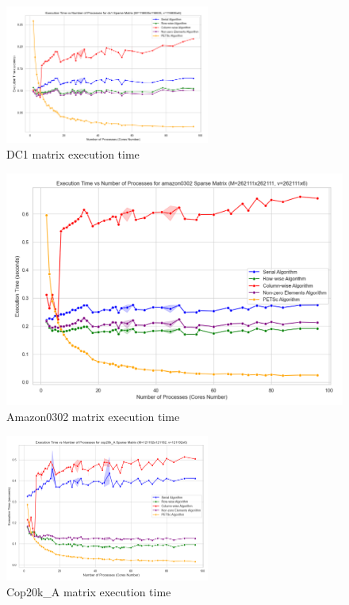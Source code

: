 \documentclass[12pt,oneside]{book} %
\begin{document}
\begin{figure}[H]
    \centering
    \includegraphics[width=0.6\textwidth]{../results/matrix_dim/dc1_k6_execution_time.png}
    \caption{DC1 matrix execution time}\label{fig:dc1-k6-execution-time}
\end{figure}

\begin{figure}[H]
    \centering
    \includegraphics[width=0.6\linewidth]{../results/matrix_dim/amazon0302_k6_execution_time.png}
    \caption{Amazon0302 matrix execution time}\label{fig:amazon0302-k6-execution-time}
\end{figure}

\begin{figure}[H]
    \centering
    \includegraphics[width=0.6\textwidth]{../results/matrix_dim/cop20k_A_k6_execution_time.png}
    \caption{Cop20k\_A matrix execution time}\label{fig:cop20k-a-k6-execution-time}
\end{figure}
\end{document}
